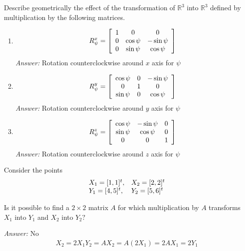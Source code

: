 \documentclass[letterpaper]{article}
\newcommand{\ans}{\textit{Answer: }}
\newenvironment{question}[2][Question]{\begin{trivlist}
\item[\hskip \labelsep {\bfseries #1}\hskip \labelsep {\bfseries #2.}]}{\end{trivlist}}
\begin{document}
\begin{question}{3.9}
    Describe geometrically the effect of the transformation of 
    $\mathbb { R } ^ { 3 }$ into $\mathbb { R } ^ { 3 }$ defined
    by multiplication by the following matrices.

    \begin{enumerate}[label=(\alph*)]
        \item $$R _ { \psi } ^ { x } = \left[ \begin{array} { c c c } { 1 } & { 0 } & { 0 } \\ { 0 } & { \cos \psi } & { - \sin \psi } \\ { 0 } & { \sin \psi } & { \cos \psi } \end{array} \right]$$
        \ans Rotation counterclockwise around $x$ axis for $\psi$

        \item $$
        R _ { \psi } ^ { y } = \left[ \begin{array} { c c c } { \cos \psi } & { 0 } & { - \sin \psi } \\ { 0 } & { 1 } & { 0 } \\ { \sin \psi } & { 0 } & { \cos \psi } \end{array} \right]
        $$
        \ans Rotation counterclockwise around $y$ axis for $\psi$

        \item $$
        R _ { \psi } ^ { z } = \left[ \begin{array} { c c c } { \cos \psi } & { - \sin \psi } & { 0 } \\ { \sin \psi } & { \cos \psi } & { 0 } \\ { 0 } & { 0 } & { 1 } \end{array} \right]
        $$
        \ans Rotation counterclockwise around $z$ axis for $\psi$
    \end{enumerate}
\end{question}

\begin{question}{3.10}
    Consider the points
    $$
    \begin{array} { l l } { X _ { 1 } = [ 1,1 ] ^ { t } , } & { X _ { 2 } = [ 2,2 ] ^ { t } } \\ { Y _ { 1 } = [ 4,5 ] ^ { t } , } & { Y _ { 2 } = [ 5,6 ] ^ { t } } \end{array}
    $$

    Is it possible to find a $2 \times 2$ matrix $A$ for which multiplication by $A$ 
    transforms $X _ { 1 }$ into $Y _ { 1 }$ and $X _ { 2 }$ into $Y _ { 2 } ?$ 

    \ans No
    \begin{gather*}
        X_2 = 2X_1
        Y_2 = AX_2 = A(2X_1) = 2AX_1 = 2Y_1
    \end{gather*}
\end{question}
\end{document}
